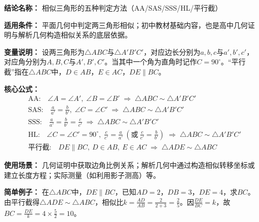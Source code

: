 \textbf{结论名称：} 相似三角形的五种判定方法（AA/SAS/SSS/HL/平行截）

\textbf{适用条件：} 平面几何中判定两三角形相似；初中教材基础内容，也是高中几何证明与解析几何构造相似关系的底层依据。

\textbf{变量说明：} 设两三角形为$\triangle ABC$与$\triangle A'B'C'$，对应边长分别为$a,b,c$与$a',b',c'$，对应角分别为$A,B,C$与$A',B',C'$。当其中一个角为直角时记作$C=90^\circ$。“平行截”指在$\triangle ABC$中，$D\in AB$，$E\in AC$，$DE\parallel BC$。

\textbf{核心公式：}
\[
\boxed{
\begin{aligned}
&\text{AA:}\quad \angle A=\angle A',\; \angle B=\angle B' \;\Longrightarrow\; \triangle ABC \sim \triangle A'B'C'\\
&\text{SAS:}\quad \frac{a}{a'}=\frac{b}{b'},\; \angle C=\angle C' \;\Longrightarrow\; \triangle ABC \sim \triangle A'B'C'\\
&\text{SSS:}\quad \frac{a}{a'}=\frac{b}{b'}=\frac{c}{c'} \;\Longrightarrow\; \triangle ABC \sim \triangle A'B'C'\\
&\text{HL:}\quad \angle C=\angle C'=90^\circ,\; \frac{c}{c'}=\frac{a}{a'}\ (\text{或}\ \frac{c}{c'}=\frac{b}{b'}) \;\Longrightarrow\; \triangle ABC \sim \triangle A'B'C'\\
&\text{平行截:}\quad DE\parallel BC,\ D\in AB,\ E\in AC \;\Longrightarrow\; \triangle ADE \sim \triangle ABC
\end{aligned}
}
\]

\textbf{使用场景：} 几何证明中获取边角比例关系；解析几何中通过构造相似转移坐标或建立长度方程；实际测量（如利用影子测高）等。

\textbf{简单例子：} 在$\triangle ABC$中，$DE\parallel BC$，已知$AD=2$，$DB=3$，$DE=4$，求$BC$。由平行截得$\triangle ADE\sim\triangle ABC$，相似比$k=\frac{AD}{AB}=\frac{2}{2+3}=\frac{2}{5}$。因$\frac{DE}{BC}=k$，故$BC=\frac{DE}{k}=4\times\frac{5}{2}=10$。